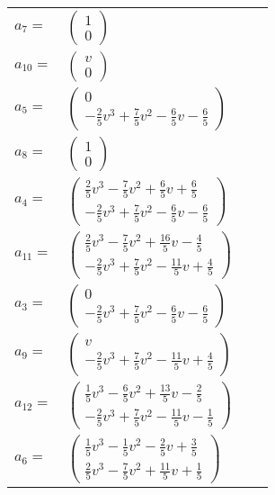 \documentclass[1p]{elsarticle_modified}
\theoremstyle{definition}
\begin{document}
\begin{tabular}{m{7pt} m{180pt} m{7pt} m{180pt} }
\flushright $a_{7}=$&$\begin{pmatrix}1\\0\end{pmatrix}$ \\
\flushright $a_{10}=$&$\begin{pmatrix}v\\0\end{pmatrix}$ \\
\flushright $a_{5}=$&$\begin{pmatrix}0\\-\frac{2}{5} v^3+\frac{7}{5} v^2-\frac{6}{5} v-\frac{6}{5}\end{pmatrix}$ \\
\flushright $a_{8}=$&$\begin{pmatrix}1\\0\end{pmatrix}$ \\
\flushright $a_{4}=$&$\begin{pmatrix}\frac{2}{5} v^3-\frac{7}{5} v^2+\frac{6}{5} v+\frac{6}{5}\\-\frac{2}{5} v^3+\frac{7}{5} v^2-\frac{6}{5} v-\frac{6}{5}\end{pmatrix}$ \\
\flushright $a_{11}=$&$\begin{pmatrix}\frac{2}{5} v^3-\frac{7}{5} v^2+\frac{16}{5} v-\frac{4}{5}\\-\frac{2}{5} v^3+\frac{7}{5} v^2-\frac{11}{5} v+\frac{4}{5}\end{pmatrix}$ \\
\flushright $a_{3}=$&$\begin{pmatrix}0\\-\frac{2}{5} v^3+\frac{7}{5} v^2-\frac{6}{5} v-\frac{6}{5}\end{pmatrix}$ \\
\flushright $a_{9}=$&$\begin{pmatrix}v\\-\frac{2}{5} v^3+\frac{7}{5} v^2-\frac{11}{5} v+\frac{4}{5}\end{pmatrix}$ \\
\flushright $a_{12}=$&$\begin{pmatrix}\frac{1}{5} v^3-\frac{6}{5} v^2+\frac{13}{5} v-\frac{2}{5}\\-\frac{2}{5} v^3+\frac{7}{5} v^2-\frac{11}{5} v-\frac{1}{5}\end{pmatrix}$ \\
\flushright $a_{6}=$&$\begin{pmatrix}\frac{1}{5} v^3-\frac{1}{5} v^2-\frac{2}{5} v+\frac{3}{5}\\\frac{2}{5} v^3-\frac{7}{5} v^2+\frac{11}{5} v+\frac{1}{5}\end{pmatrix}$ \\

\end{tabular}
\end{document}

